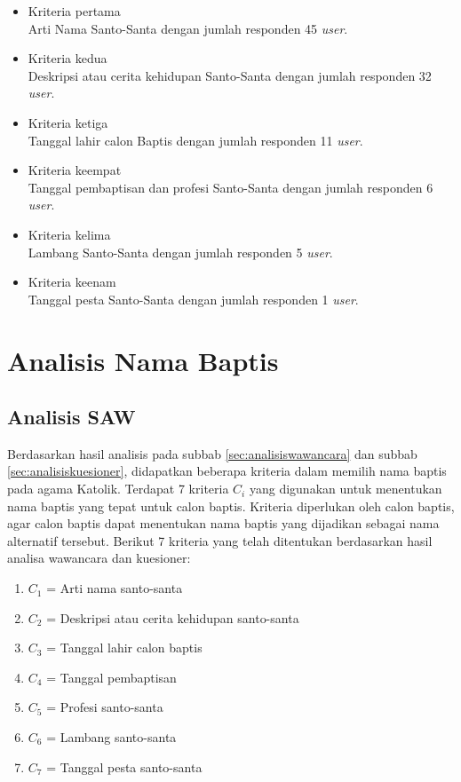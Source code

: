 	\begin{itemize}
		\item Kriteria pertama \\
		Arti Nama Santo-Santa dengan jumlah responden 45 \textit{user}.
		\item Kriteria kedua \\
		Deskripsi atau cerita kehidupan Santo-Santa dengan jumlah responden 32 \textit{user}.
		\item Kriteria ketiga \\
		Tanggal lahir calon Baptis dengan jumlah responden 11 \textit{user}.
		\item Kriteria keempat \\
		Tanggal pembaptisan dan profesi Santo-Santa dengan jumlah responden 6 \textit{user}.
		\item Kriteria kelima\\
		Lambang Santo-Santa dengan jumlah responden 5 \textit{user}.
		\item Kriteria keenam\\
		Tanggal pesta Santo-Santa dengan jumlah responden 1 \textit{user}.
	\end{itemize}
	

\section{Analisis Nama Baptis }
\label{sec:analisisnb}

\subsection{Analisis SAW}
\label{sec:analisissaw}
	
	Berdasarkan hasil analisis pada subbab \ref{sec:analisiswawancara} dan subbab \ref{sec:analisiskuesioner}, didapatkan beberapa kriteria dalam memilih nama baptis pada agama Katolik. Terdapat 7 kriteria $C_{i}$ yang digunakan untuk menentukan nama baptis yang tepat untuk calon baptis. Kriteria diperlukan oleh calon baptis, agar calon baptis dapat menentukan nama baptis yang dijadikan sebagai nama alternatif tersebut. Berikut 7 kriteria yang telah ditentukan berdasarkan hasil analisa wawancara dan kuesioner:
\begin{enumerate}
	\item $C_{1}$ = Arti nama santo-santa
	\item $C_{2}$ = Deskripsi atau cerita kehidupan santo-santa
	\item $C_{3}$ = Tanggal lahir calon baptis
	\item $C_{4}$ = Tanggal pembaptisan
	\item $C_{5}$ = Profesi santo-santa
	\item $C_{6}$ = Lambang santo-santa
	\item $C_{7}$ = Tanggal pesta santo-santa
\end{enumerate}
	
